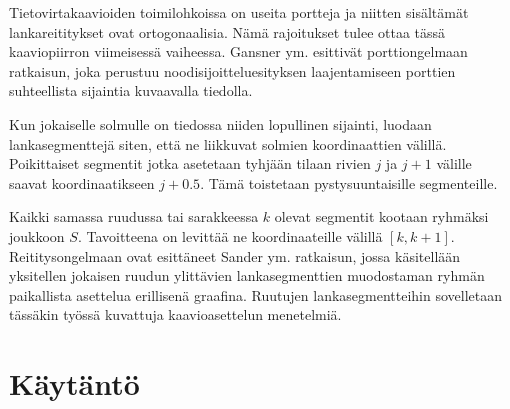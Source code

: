 \documentclass[finnish,12pt]{article}
\begin{document}
Tietovirtakaavioiden toimilohkoissa on useita portteja ja niitten sisältämät lankareititykset ovat ortogonaalisia.
Nämä rajoitukset tulee ottaa tässä kaaviopiirron viimeisessä vaiheessa.
Gansner ym. esittivät porttiongelmaan ratkaisun, joka perustuu noodisijoitteluesityksen laajentamiseen porttien suhteellista sijaintia kuvaavalla tiedolla.\cite{RefWorks:28}

Kun jokaiselle solmulle on tiedossa niiden lopullinen sijainti, luodaan lankasegmenttejä siten, että ne liikkuvat solmien koordinaattien välillä.
Poikittaiset segmentit jotka asetetaan tyhjään tilaan rivien $j$ ja $j+1$ välille saavat koordinaatikseen $j+0.5$.
Tämä toistetaan pystysuuntaisille segmenteille.

Kaikki samassa ruudussa tai sarakkeessa $k$ olevat segmentit kootaan ryhmäksi joukkoon $S$.
Tavoitteena on levittää ne koordinaateille välillä $[k, k+1]$.
Reititysongelmaan ovat esittäneet Sander ym. ratkaisun, jossa käsitellään yksitellen jokaisen ruudun ylittävien lankasegmenttien muodostaman ryhmän paikallista asettelua erillisenä graafina. \cite{RefWorks:17}
Ruutujen lankasegmentteihin sovelletaan tässäkin työssä kuvattuja kaavioasettelun menetelmiä.







	\clearpage
	\section{Käytäntö}
\end{document}
